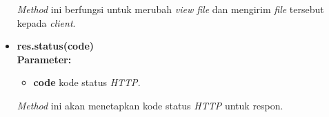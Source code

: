 \begin{itemize}
	\textit{Method} ini berfungsi untuk merubah \textit{view file} dan mengirim \textit{file} tersebut kepada \textit{client}.
	
	
%	
%
%
	
	\item \textbf{res.status(code)} \\ \textbf{Parameter:}
	\begin{itemize}
		\item \textbf{code} kode status \textit{HTTP}.
	\end{itemize}
	
	\textit{Method} ini akan menetapkan kode status \textit{HTTP} untuk respon. 
	
	
%	
%	
	
\end{itemize}

